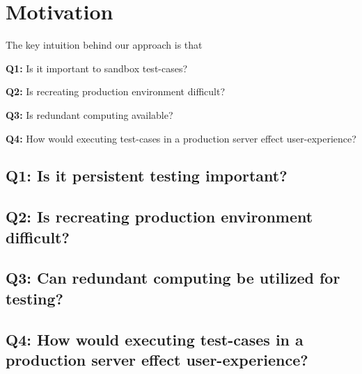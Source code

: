 
\section{Motivation}

The key intuition behind our approach is that \\


\begin{compactitem}
\setlength{\itemsep}{1Pt}
\item[]\textbf{Q1:} Is it important to sandbox test-cases?
\item[]\textbf{Q2:} Is recreating production environment difficult? 
\item[]\textbf{Q3:} Is redundant computing available? 
\item[]\textbf{Q4:} How would executing test-cases in a production server effect user-experience?
\end{compactitem}

\subsection{\textbf{Q1:} Is it persistent testing important?}
\subsection{\textbf{Q2:} Is recreating production environment difficult?}
\subsection{\textbf{Q3:} Can redundant computing be utilized for testing?}
\subsection{\textbf{Q4:} How would executing test-cases in a production server effect user-experience?}

